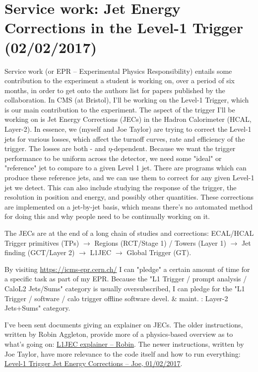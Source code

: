 
\chapter{Service work: Jet Energy Corrections in the Level-1 Trigger (02/02/2017)}

Service work (or EPR -- Experimental Physics Responsibility) entails some contribution to the experiment a student is working on, over a period of six months, in order to get onto the authors list for papers published by the collaboration. In CMS (at Bristol), I'll be working on the Level-1 Trigger, which is our main contribution to the experiment. The aspect of the trigger I'll be working on is Jet Energy Corrections (JECs) in the Hadron Calorimeter (HCAL, Layer-2). In essence, we (myself and Joe Taylor) are trying to correct the Level-1 jets for various losses, which affect the turnoff curves, rate and efficiency of the trigger. The losses are both \pt- and $\eta$-dependent. Because we want the trigger performance to be uniform across the detector, we need some "ideal" or "reference" jet to compare to a given Level 1 jet. There are programs which can produce these reference jets, and we can use them to correct for any given Level-1 jet we detect. This can also include studying the response of the trigger, the resolution in position and energy, and possibly other quantities. These corrections are implemented on a jet-by-jet basis, which means there's no automated method for doing this and why people need to be continually working on it.

The JECs are at the end of a long chain of studies and corrections: ECAL/HCAL Trigger primitives (TPs) $\rightarrow$ Regions (RCT/Stage 1) / Towers (Layer 1) $\rightarrow$ Jet finding (GCT/Layer 2) $\rightarrow$ L1JEC $\rightarrow$ Global Trigger (GT).

By visiting \url{https://icms-epr.cern.ch/} I can "pledge" a certain amount of time for a specific task as part of my EPR. Because the "L1 Trigger / prompt analysis / CaloL2 Jets/Sums" category is usually oversubscribed, I can pledge for the "L1 Trigger / software / calo trigger offline software devel. \& maint. : Layer-2 Jets+Sums" category. 

I've been sent documents giving an explainer on JECs. The older instructions, written by Robin Aggleton, provide more of a physics-based overview as to what's going on: \href{run:./sec20/l1jec_explainer.pdf}{L1JEC explainer -- Robin}. The newer instructions, written by Joe Taylor, have more relevance to the code itself and how to run everything: \href{run:./sec20/2017_02_01_L1JECinstructions.pdf}{Level-1 Trigger Jet Energy Corrections -- Joe, 01/02/2017}.

